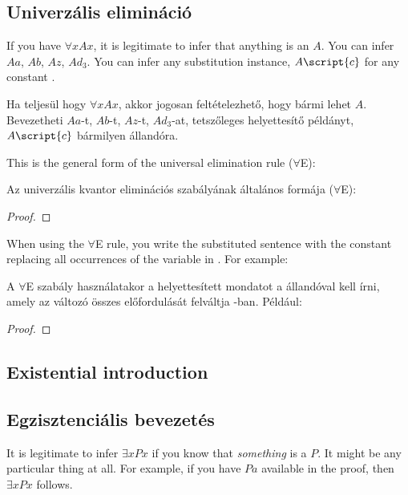 \subsection{Univerzális elimináció}

If you have $\forall x Ax$, it is legitimate to infer that anything is an $A$. You can infer $Aa$, $Ab$, $Az$, $Ad_3$. You can infer any substitution instance, $A\script{c}$ for any constant .

Ha teljesül hogy $\forall x Ax$, akkor jogosan feltételezhető, hogy bármi lehet $A$. Bevezetheti $Aa$-t, $Ab$-t, $Az$-t, $Ad_3$-at, tetszőleges helyettesítő példányt, $A\script{c}$ bármilyen  állandóra.

This is the general form of the universal elimination rule ($\forall$E):

Az univerzális kvantor eliminációs szabályának általános formája ($\forall$E):

\begin{proof}
	 
\end{proof}

When using the $\forall$E rule, you write the substituted sentence with the constant  replacing all occurrences of the variable  in . For example:

A $\forall$E szabály használatakor a helyettesített mondatot a  állandóval kell írni, amely az   változó összes előfordulását felváltja -ban. Például:

\begin{proof}
	 
	 
\end{proof}


\subsection*{Existential introduction}

\subsection{Egzisztenciális bevezetés}

It is legitimate to infer $\exists x Px$ if you know that \emph{something} is a $P$. It might be any particular thing at all. For example, if you have $Pa$ available in the proof, then $\exists x Px$ follows. 

